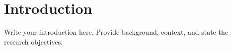 \section{Introduction}
\label{sec:introduction}

Write your introduction here. Provide background, context, and state the research objectives.


